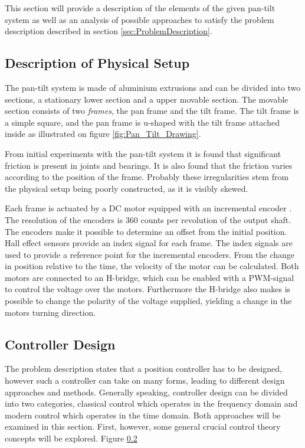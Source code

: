\documentclass[../../main.tex]{subfiles}
\begin{document}
This section will provide a description of the elements of the given pan-tilt system as well as an analysis of possible approaches to satisfy the problem description described in section \ref{sec:ProblemDescription}.

\subsection{Description of Physical Setup}
The pan-tilt system is made of aluminium extrusions and can be divided into two sections, a stationary lower section and a upper movable section. The movable section consists of two \textit{frames}, the pan frame and the tilt frame. The tilt frame is a simple square, and the pan frame is u-shaped with the tilt frame attached inside as illustrated on figure \ref{fig:Pan_Tilt_Drawing}.

From initial experiments with the pan-tilt system it is found that significant friction is present in joints and bearings. It is also found that the friction varies according to the position of the frame. Probably these irregularities stem from the physical setup being poorly constructed, as it is visibly skewed.  

Each frame is actuated by a DC motor equipped with an incremental encoder \cite{}. The resolution of the encoders is 360 counts per revolution of the output shaft. The encoders make it possible to determine an offset from the initial position. Hall effect sensors \cite{} provide an index signal for each frame. The index signals are used to provide a reference point for the incremental encoders. From the change in position relative to the time, the velocity of the motor can be calculated. Both motors are connected to an H-bridge, which can be enabled with a PWM-signal to control the voltage over the motors. Furthermore the H-bridge also makes is possible to change the polarity of the voltage supplied, yielding a change in the motors turning direction.

\subsection{Controller Design}
The problem description states that a position controller has to be designed, however such a controller can take on many forms, leading to different design approaches and methods. Generally speaking, controller design can be divided into two categories, classical control which operates in the frequency domain and modern control which operates in the time domain. Both approaches will be examined in this section. First, however, some general crucial control theory concepts will be explored.
Figure \ref{}
\end{document}
